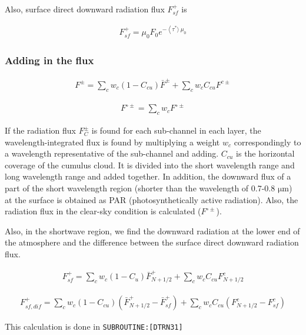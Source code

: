 Also, surface direct downward radiation flux \(F_{s f}^{+}\) is

\begin{eqnarray}
F_{s f}^{+}=\mu_{0} F_{0} e^{-\left\langle\tau^{*}\rangle\ \mu_{0}\right.}
\end{eqnarray}

\hypertarget{adding-in-the-flux}{%
\subsubsection{Adding in the flux}\label{adding-in-the-flux}}

\begin{eqnarray}
F^{\pm}=\sum_{c} w_{c}\left(1-C_{c u}\right) \bar{F}^{\pm}+\sum_{c} w_{c} C_{c u} F^{c \pm}
\end{eqnarray}

\begin{eqnarray}
F^{\circ \pm}=\sum_{c} w_{c} F^{\circ \pm}
\end{eqnarray}

If the radiation flux \(F_{C}^{\pm}\) is found for each sub-channel in each layer, the wavelength-integrated flux is found by multiplying a weight \(w_c\) correspondingly to a wavelength
representative of the sub-channel and adding. \(C_{cu}\) is the horizontal coverage of the cumulus cloud. It is divided into the short wavelength range and long wavelength range and added together. In
addition, the downward flux of a part of the short wavelength region (shorter than the wavelength of 0.7-0.8 \(\mathrm{{\mu}m}\)) at the surface is obtained as PAR (photosynthetically active
radiation). Also, the radiation flux in the clear-sky condition is calculated (\(F^{\circ \pm}\)).

Also, in the shortwave region, we find the downward radiation at the lower end of the atmosphere and the difference between the surface direct downward radiation flux.

\begin{eqnarray}
F_{s f}^{+}=\sum_{c} w_{c}\left(1-C_{u}\right) \bar{F}_{N+1 / 2}^{+}+\sum_{c} w_{c} C_{c u} F_{N+1 / 2}^{c}
\end{eqnarray}

\begin{eqnarray}
F_{s f, d i f}^{+}=\sum_{c} w_{c}\left(1-C_{c u}\right)\left(\bar{F}_{N+1 / 2}^{+}-\bar{F}_{s f}^{+}\right)+\sum_{c} w_{c} C_{c u}\left(F_{N+1 / 2}^{c}-F_{s f}^{c}\right)
\end{eqnarray}

This calculation is done in \texttt{SUBROUTINE:{[}DTRN31{]}}

